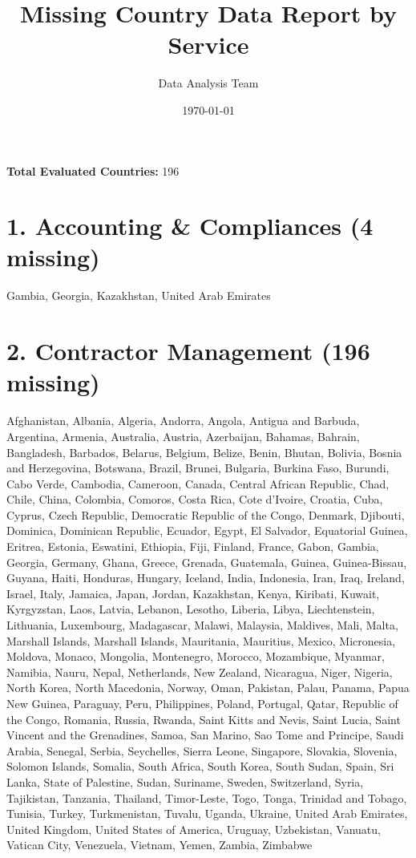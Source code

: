 \documentclass{article}
\title{Missing Country Data Report by Service}
\author{Data Analysis Team}
\date{\today}
\begin{document}
\maketitle

\noindent\textbf{Total Evaluated Countries:} 196

\section*{1. Accounting \& Compliances (4 missing)}
Gambia, Georgia, Kazakhstan, United Arab Emirates

\section*{2. Contractor Management (196 missing)}
Afghanistan, Albania, Algeria, Andorra, Angola, Antigua and Barbuda, Argentina, Armenia, Australia, Austria, Azerbaijan, Bahamas, Bahrain, Bangladesh, Barbados, Belarus, Belgium, Belize, Benin, Bhutan, Bolivia, Bosnia and Herzegovina, Botswana, Brazil, Brunei, Bulgaria, Burkina Faso, Burundi, Cabo Verde, Cambodia, Cameroon, Canada, Central African Republic, Chad, Chile, China, Colombia, Comoros, Costa Rica, Cote d'Ivoire, Croatia, Cuba, Cyprus, Czech Republic, Democratic Republic of the Congo, Denmark, Djibouti, Dominica, Dominican Republic, Ecuador, Egypt, El Salvador, Equatorial Guinea, Eritrea, Estonia, Eswatini, Ethiopia, Fiji, Finland, France, Gabon, Gambia, Georgia, Germany, Ghana, Greece, Grenada, Guatemala, Guinea, Guinea-Bissau, Guyana, Haiti, Honduras, Hungary, Iceland, India, Indonesia, Iran, Iraq, Ireland, Israel, Italy, Jamaica, Japan, Jordan, Kazakhstan, Kenya, Kiribati, Kuwait, Kyrgyzstan, Laos, Latvia, Lebanon, Lesotho, Liberia, Libya, Liechtenstein, Lithuania, Luxembourg, Madagascar, Malawi, Malaysia, Maldives, Mali, Malta, Marshall Islands, Marshall Islands, Mauritania, Mauritius, Mexico, Micronesia, Moldova, Monaco, Mongolia, Montenegro, Morocco, Mozambique, Myanmar, Namibia, Nauru, Nepal, Netherlands, New Zealand, Nicaragua, Niger, Nigeria, North Korea, North Macedonia, Norway, Oman, Pakistan, Palau, Panama, Papua New Guinea, Paraguay, Peru, Philippines, Poland, Portugal, Qatar, Republic of the Congo, Romania, Russia, Rwanda, Saint Kitts and Nevis, Saint Lucia, Saint Vincent and the Grenadines, Samoa, San Marino, Sao Tome and Principe, Saudi Arabia, Senegal, Serbia, Seychelles, Sierra Leone, Singapore, Slovakia, Slovenia, Solomon Islands, Somalia, South Africa, South Korea, South Sudan, Spain, Sri Lanka, State of Palestine, Sudan, Suriname, Sweden, Switzerland, Syria, Tajikistan, Tanzania, Thailand, Timor-Leste, Togo, Tonga, Trinidad and Tobago, Tunisia, Turkey, Turkmenistan, Tuvalu, Uganda, Ukraine, United Arab Emirates, United Kingdom, United States of America, Uruguay, Uzbekistan, Vanuatu, Vatican City, Venezuela, Vietnam, Yemen, Zambia, Zimbabwe
\end{document}
